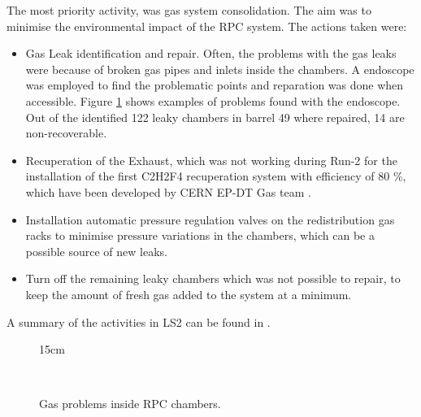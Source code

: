 The most priority activity, was gas system consolidation. The aim was to minimise the environmental impact of the RPC system. The actions taken were:
\begin{itemize}
    \item Gas Leak identification and repair. Often, the problems with the gas leaks were because of broken gas pipes and inlets inside the chambers. A endoscope was employed to find the problematic points and reparation was done when accessible. Figure \ref{fig:gas_problems} shows examples of problems found with the endoscope. Out of the identified 122 leaky chambers in barrel 49 where repaired, 14 are non-recoverable.
    \item Recuperation of the Exhaust, which was not working during Run-2 for the installation of the first C2H2F4 recuperation system with efficiency of 80 \%, which have been developed by CERN EP-DT Gas team \cite{Corbetta:2020esl}.
    \item Installation automatic pressure regulation valves on the redistribution gas racks to minimise pressure variations in the chambers, which can be a possible source of new leaks.
    \item Turn off the remaining leaky chambers which was not possible to repair, to keep the amount of fresh gas added to the system at a minimum.
\end{itemize}
A summary of the activities in LS2 can be found in \cite{Amarilo_2022}.

\begin{figure}[!htm]{15cm}
  \caption{Gas problems inside RPC chambers.} 
  \label{fig:gas_problems}
  \hfill
  \\
\end{figure}

